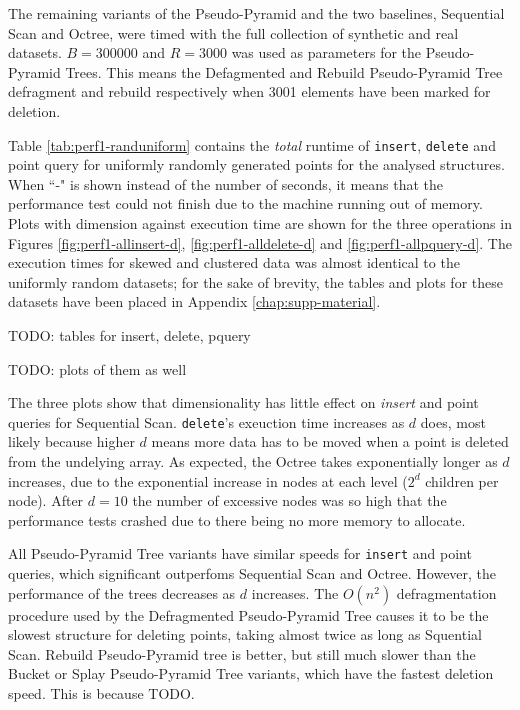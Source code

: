 The remaining variants of the Pseudo-Pyramid and the two baselines, Sequential Scan and Octree, were timed with the full collection of synthetic and real datasets. $B = 300000$ and $R=3000$ was used as parameters for the Pseudo-Pyramid Trees. This means the Defagmented and Rebuild Pseudo-Pyramid Tree defragment and rebuild respectively when 3001 elements have been marked for deletion.

Table \ref{tab:perf1-randuniform} contains the \textit{total} runtime of \texttt{insert}, \texttt{delete} and point query for uniformly randomly generated points for the analysed structures. When ``-" is shown instead of the number of seconds, it means that the performance test could not finish due to the machine running out of memory. Plots with dimension against execution time are shown for the three operations in Figures \ref{fig:perf1-allinsert-d}, \ref{fig:perf1-alldelete-d} and \ref{fig:perf1-allpquery-d}. The execution times for skewed and clustered data was almost identical to the uniformly random datasets; for the sake of brevity, the tables and plots for these datasets have been placed in Appendix \ref{chap:supp-material}. 

TODO: tables for insert, delete, pquery 

TODO: plots of them as well

The three plots show that dimensionality has little effect on \textit{insert} and point queries for Sequential Scan. \texttt{delete}'s exeuction time increases as $d$ does, most likely because higher $d$ means more data has to be moved when a point is deleted from the undelying array. As expected, the Octree takes exponentially longer as $d$ increases, due to the exponential increase in nodes at each level ($2^d$ children per node). After $d = 10$ the number of excessive nodes was so high that the performance tests crashed due to there being no more memory to allocate.

All Pseudo-Pyramid Tree variants have similar speeds for \texttt{insert} and point queries, which significant outperfoms Sequential Scan and Octree. However, the performance of the trees decreases as $d$ increases. The $O(n^2)$ defragmentation procedure used by the Defragmented Pseudo-Pyramid Tree causes it to be the slowest structure for deleting points, taking almost twice as long as Squential Scan. Rebuild Pseudo-Pyramid tree is better, but still much slower than the Bucket or Splay Pseudo-Pyramid Tree variants, which have the fastest deletion speed. This is because TODO.

